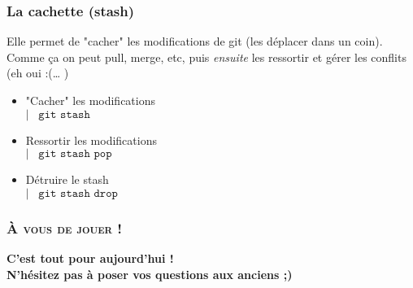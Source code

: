 \documentclass[9pt,a9paper,handout]{beamer}
\newcommand{\command}[1]{$\left|\;\;\;\texttt{#1}\right.$}
\begin{document}
\begin{frame}
\frametitle{La cachette (stash)}
Elle permet de "cacher" les modifications de git (les déplacer dans un coin). Comme ça on peut pull, merge, etc, puis \emph{ensuite} les ressortir et gérer les conflits (eh oui :(… )
\begin{itemize}
    \item "Cacher" les modifications\\\command{git stash}
    \item Ressortir les modifications\\\command{git stash pop}
    \item Détruire le stash\\\command{git stash drop}
\end{itemize}
\end{frame}


















\begin{frame}
    \frametitle{\textsc{À vous de jouer  !}}
    \begin{center}
    \Large \textbf{C'est tout pour aujourd'hui !\\ N'hésitez pas à poser vos questions aux anciens ;) }
    \end{center}
\end{frame}
\end{document}
